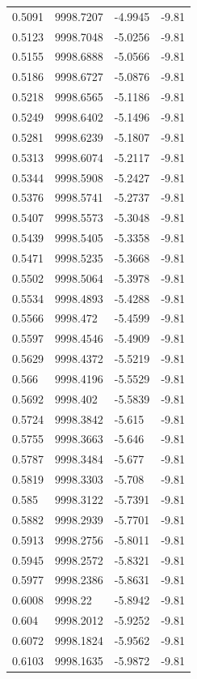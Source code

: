 \begin{table}[H]
\begin{tabular}{llll}
0.5091 & 9998.7207 & -4.9945 & -9.81 \\
0.5123 & 9998.7048 & -5.0256 & -9.81 \\
0.5155 & 9998.6888 & -5.0566 & -9.81 \\
0.5186 & 9998.6727 & -5.0876 & -9.81 \\
0.5218 & 9998.6565 & -5.1186 & -9.81 \\
0.5249 & 9998.6402 & -5.1496 & -9.81 \\
0.5281 & 9998.6239 & -5.1807 & -9.81 \\
0.5313 & 9998.6074 & -5.2117 & -9.81 \\
0.5344 & 9998.5908 & -5.2427 & -9.81 \\
0.5376 & 9998.5741 & -5.2737 & -9.81 \\
0.5407 & 9998.5573 & -5.3048 & -9.81 \\
0.5439 & 9998.5405 & -5.3358 & -9.81 \\
0.5471 & 9998.5235 & -5.3668 & -9.81 \\
0.5502 & 9998.5064 & -5.3978 & -9.81 \\
0.5534 & 9998.4893 & -5.4288 & -9.81 \\
0.5566 & 9998.472 & -5.4599 & -9.81 \\
0.5597 & 9998.4546 & -5.4909 & -9.81 \\
0.5629 & 9998.4372 & -5.5219 & -9.81 \\
0.566 & 9998.4196 & -5.5529 & -9.81 \\
0.5692 & 9998.402 & -5.5839 & -9.81 \\
0.5724 & 9998.3842 & -5.615 & -9.81 \\
0.5755 & 9998.3663 & -5.646 & -9.81 \\
0.5787 & 9998.3484 & -5.677 & -9.81 \\
0.5819 & 9998.3303 & -5.708 & -9.81 \\
0.585 & 9998.3122 & -5.7391 & -9.81 \\
0.5882 & 9998.2939 & -5.7701 & -9.81 \\
0.5913 & 9998.2756 & -5.8011 & -9.81 \\
0.5945 & 9998.2572 & -5.8321 & -9.81 \\
0.5977 & 9998.2386 & -5.8631 & -9.81 \\
0.6008 & 9998.22 & -5.8942 & -9.81 \\
0.604 & 9998.2012 & -5.9252 & -9.81 \\
0.6072 & 9998.1824 & -5.9562 & -9.81 \\
0.6103 & 9998.1635 & -5.9872 & -9.81 \\

\end{tabular}
\end{table}

